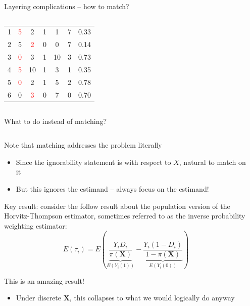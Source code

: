 \documentclass[notes,11pt, aspectratio=169]{beamer}
\newenvironment{wideitemize}{\itemize\addtolength{\itemsep}{10pt}}{\enditemize}
\begin{document}
\begin{frame}{Layering complications -- how to match?}
\begin{columns}[T]
\begin{column}{.5\textwidth}
{\begin{tabular}{ccccccc}
    \midrule
    1 & \textcolor{red}{5} & 2 & 1 & 1 & 7 & 0.33\\
    2 & 5 & \textcolor{red}{2} & 0 & 0 & 7 & 0.14\\    
    3 & \textcolor{red}{0} & 3 & 1 & 10 & 3 & 0.73\\
    4 & \textcolor{red}{5} & 10 & 1 & 3 & 1 & 0.35\\
    5 & \textcolor{red}{0} & 2 & 1 & 5 & 2 & 0.78\\
    6 & 0 & \textcolor{red}{3} & 0 & 7 & 0 & 0.70\\        
  \end{tabular}
  }
\end{column}%
\end{columns}
\end{frame}

\begin{frame}{What to do instead of matching? }
\begin{columns}[T] %
\begin{column}{.8\textwidth}
  \begin{wideitemize}
  \item Note that matching addresses the problem literally
    \begin{itemize}
    \item Since the ignorability statement is with respect to $X$, natural to match on it
    \item But this ignores the estimand -- always focus on the estimand!
    \end{itemize}
  \item Key result: consider the follow result about the population
    version of the Horvitz-Thompson estimator, sometimes referred to
    as the inverse probability weighting estimator:
    \begin{equation*}
      E(\tau_{i}) = E\left(\underbrace{\frac{Y_{i}D_{i}}{\pi(\mathbf{X})}}_{E(Y_{i}(1))} - \underbrace{\frac{Y_{i}(1-D_{i})}{1-\pi(\mathbf{X})}}_{E(Y_{i}(0))}\right)
    \end{equation*}
  \item This is an amazing result!
    \begin{itemize}
    \item Under discrete $\mathbf{X}$, this collapses to what we would logically do anyway
    \end{itemize}
    \end{wideitemize}
\end{column}%
\hfill%
\begin{column}{.4\textwidth}

\end{column}%
\end{columns}
\end{frame}
\end{document}
